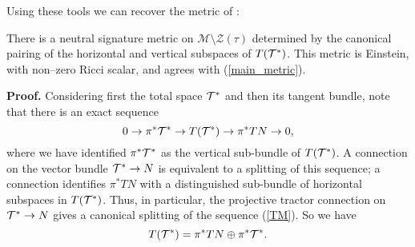 Using these tools we can recover the metric of \cite{DM}:
\begin{theo}\label{metric} 
  There is a neutral signature metric on $\mathcal{M}\setminus \mathcal{Z}(\tau)$ determined by the canonical pairing of the horizontal and vertical subspaces
of $T(\mathcal{T}^*)$. This metric is Einstein, with non--zero Ricci scalar, and 
agrees with (\ref{main_metric}).
\end{theo}
{\bf Proof.}
 Considering first the total space $\mathcal{T}^*$ and then its tangent
 bundle, note that there is an exact sequence
  \begin{equation}\label{TM}
0\to \pi^* \mathcal{T}^*\to T(\mathcal{T}^*)\to \pi^*TN\to 0,
  \end{equation}
  where we have identified $\pi^* \mathcal{T}^*$ as the vertical sub-bundle of $T(\mathcal{T}^*)$.
A connection on the vector bundle $\mathcal{T}^*\to N$ is equivalent to a
splitting of this sequence; a connection identifies $\pi^*TN$ with a distinguished  sub-bundle of horizontal subspaces in 
$ T(\mathcal{T}^*)$.
Thus, in particular, the projective tractor
connection on $\mathcal{T}^*\to N$ gives a canonical splitting of the sequence (\ref{TM}).
So we have 
\begin{equation}\label{HV}
T(\mathcal{T}^*)=  \pi^*TN\oplus \pi^* \mathcal{T}^* .
\end{equation}


